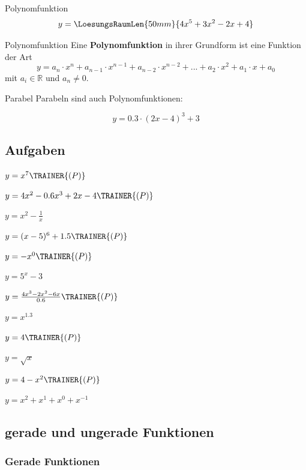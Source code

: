 \newpage


\begin{beispiel}{Polynomfunktion}{}
  $$y=\LoesungsRaumLen{50mm}{4x^5 + 3x^2 -2x + 4}$$
\end{beispiel}



\begin{definition}{Polynomfunktion}{}
  Eine \textbf{Polynomfunktion} in ihrer Grundform ist eine Funktion
  der Art
  $$y = a_n\cdot{}x^n + a_{n-1}\cdot{}x^{n-1} + a_{n-2}\cdot{}x^{n-2}
  + ... + a_2\cdot{}x^2 + a_1\cdot{}x + a_0$$
  mit $a_i\in \mathbb{R}$ und $a_n\ne 0$.
\end{definition}

\begin{bemerkung}{Parabel}{}
  Parabeln sind auch Polynomfunktionen:

  $$y  = 0.3\cdot{}(2x-4)^3 + 3$$
  
\end{bemerkung}


\subsection*{Aufgaben}

$y=x^7\TRAINER{ (P)}$

$y=4x^2-0.6x^3+2x -4\TRAINER{ (P)}$

$y=x^2-\frac1{x}$

$y=(x-5)^6 + 1.5\TRAINER{ (P)}$

$y=-x^{0}\TRAINER{ (P)}$

$y=5^x-3$

$y=\frac{4x^3-2x^2-6x}{0.6}\TRAINER{ (P)}$

$y=x^{1.3}$

$y=4\TRAINER{ (P)}$

$y=\sqrt{x}$

$y=4-x^2\TRAINER{ (P)}$

$y=x^2 + x^1 + x^0 + x^{-1}$

\newpage

\subsection{gerade und ungerade Funktionen}
\subsubsection{Gerade Funktionen}

